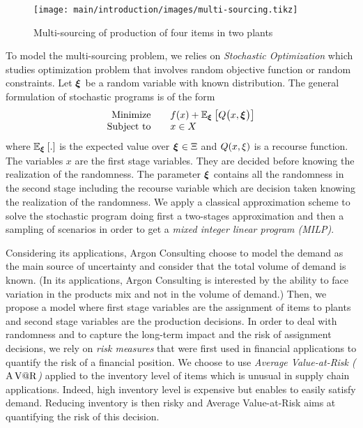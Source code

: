 \begin{figure}[!ht]
  \centering
  \texttt{[image: main/introduction/images/multi-sourcing.tikz]}
  \caption{Multi-sourcing of production of four items in two plants}
  \label{fig:intro:en:multi-sourcing}
\end{figure}


\medskip


To model the multi-sourcing problem, we relies on \emph{Stochastic Optimization} which studies optimization problem that involves random objective function or random constraints.
Let $\va \xi$ be a random variable with known distribution.
The general formulation of stochastic programs is of the form
\begin{equation}
\begin{array}{rl}
  \mbox{Minimize} \quad & f(x) + \espe_{\va\xi}\sqbracket{Q\bracket{x,\va\xi}} \\
  \mbox{Subject to} \quad & x \in X
\end{array}
\end{equation}
where $\espe_{\va\xi}\sqbracket{.}$ is the expected value over $\va\xi\in\Xi$ and $Q\bracket{x,\xi}$ is a recourse function. 
The variables $x$ are the first stage variables.
They are decided before knowing the realization of the randomness.
The parameter $\va\xi$ contains all the randomness in the second stage including the recourse variable which are decision taken knowing the realization of the randomness.
We apply a classical approximation scheme to solve the stochastic program doing first a two-stages approximation and then a sampling of scenarios in order to get a \emph{mixed integer linear program (MILP)}.


\medskip


Considering its applications, Argon Consulting choose to model the demand as the main source of uncertainty  and consider that the total volume of demand is known.
(In its applications, Argon Consulting is interested by the ability to face variation in the products mix and not in the volume of demand.)
Then, we propose a model where first stage variables are the assignment of items to plants and second stage variables are the production decisions.
In order to deal with randomness and to capture the long-term impact and the risk of assignment decisions, we rely on \emph{risk measures} that were first used in financial applications to quantify the risk of a financial position.
We choose to use \emph{Average Value-at-Risk ($\operatorname{A\operatorname{V@R}}$)} applied to the inventory level of items which is unusual in supply chain applications.
Indeed, high inventory level is expensive but enables to easily satisfy demand.
Reducing inventory is then risky and Average Value-at-Risk aims at quantifying the risk of this decision.



